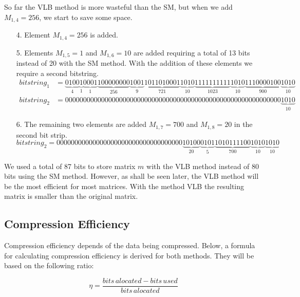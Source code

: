 \documentclass[10pt]{article}
\begin{document}
So far the VLB method is more wasteful than the SM, but when we add $M_{1,4} 
=256$, we start to save some space.

\begin{enumerate}
 \item[4.] Element $M_{1,4} =256$ is added.  
 \item [5.] Elements $M_{1,5} =1$ and $M_{1,6} =10$ are added requiring a total 
of 13 bits instead of 20 with the SM method. With the addition of these elements 
we require a second bitstring. 
 \begin{align*} \label{eq:12}
 bitstring_1 &=
 \underbrace{0100}_{4}\underbrace{1}_{1}\underbrace{0001}_{1}\underbrace{100000000}_{256}\underbrace{1001}_{9}\underbrace{1011010001}_{721}\underbrace{1010}_{10}\underbrace{1111111111}_{1023}\underbrace{1010}_{10}\underbrace{1110000100}_{900}\underbrace{1010}_{10} \\
 bitstring_2 &= 000000000000000000000000000000000000000000000000000000000000\underbrace{1010}_{10}
\end{align*}
 \item [6.] The remaining two elements are added $M_{1,7} =700$ and $M_{1,8} 
=20$ in the second bit strip. 
 \begin{equation*} \label{eq:13}
 bitstring_2 = 00000000000000000000000000000000000\underbrace{10100}_{20}\underbrace{0101}_{5}\underbrace{1010111100}_{700}\underbrace{1010}_{10}\underbrace{1010}_{10}
\end{equation*}
\end{enumerate}

 We used a total of 87 bits to store matrix $m$ with the VLB method instead of 
80 bits using the SM method. However, as shall be seen later, the VLB method 
will be the most efficient for most matrices.  With the method 
VLB the resulting matrix is smaller than the original matrix.
 
\subsection*{Compression Efficiency}
 Compression efficiency depends of the data being compressed. Below, a formula 
for calculating compression efficiency is derived for both methods. They will be 
based on the following ratio: 
 
\begin{equation}\label{eq:14}
  \eta=\frac{bits\, alocated-bits\, used}{bits\,alocated}
\end{equation}
 
\end{document}
